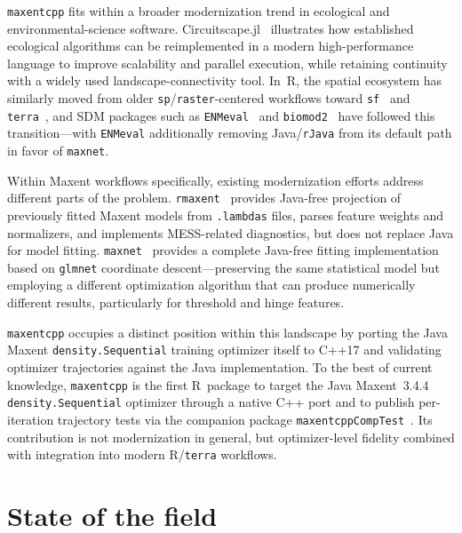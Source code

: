 \documentclass[10pt,letterpaper]{article}
\begin{document}
\texttt{maxentcpp} fits within a broader modernization trend in
ecological and environmental-science software.
Circuitscape.jl~\cite{Hall2021} illustrates how established ecological
algorithms can be reimplemented in a modern high-performance language to
improve scalability and parallel execution, while retaining continuity
with a widely used landscape-connectivity tool.
In~R, the spatial ecosystem has similarly moved from older
\texttt{sp}/\texttt{raster}-centered workflows toward
\texttt{sf}~\cite{Pebesma2018} and \texttt{terra}~\cite{Hijmans2024},
and SDM packages such as \texttt{ENMeval}~\cite{Kass2021} and
\texttt{biomod2}~\cite{Thuiller2009} have followed this
transition---with \texttt{ENMeval} additionally removing
Java/\texttt{rJava} from its default path in favor of \texttt{maxnet}.

Within Maxent workflows specifically, existing modernization efforts
address different parts of the problem.
\texttt{rmaxent}~\cite{Baumgartner2017} provides Java-free projection of
previously fitted Maxent models from \texttt{.lambdas} files, parses
feature weights and normalizers, and implements MESS-related diagnostics,
but does not replace Java for model fitting.
\texttt{maxnet}~\cite{Phillips2024maxnet} provides a complete Java-free
fitting implementation based on \texttt{glmnet} coordinate
descent---preserving the same statistical model but employing a different
optimization algorithm that can produce numerically different results,
particularly for threshold and hinge features.

\texttt{maxentcpp} occupies a distinct position within this landscape by
porting the Java Maxent \texttt{density.Sequential} training optimizer
itself to C++17 and validating optimizer trajectories against the Java
implementation.
To the best of current knowledge, \texttt{maxentcpp} is the first
R~package to target the Java Maxent~3.4.4 \texttt{density.Sequential}
optimizer through a native C++ port and to publish per-iteration
trajectory tests via the companion package
\texttt{maxentcppCompTest}~\cite{maxentcppCompTest2025}.
Its contribution is not modernization in general, but optimizer-level
fidelity combined with integration into modern R/\texttt{terra}
workflows.

\section*{State of the field}
\end{document}
